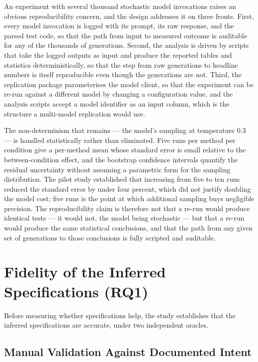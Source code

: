 An experiment with several thousand stochastic model invocations raises an
obvious reproducibility concern, and the design addresses it on three fronts.
First, every model invocation is logged with its prompt, its raw response, and
the parsed test code, so that the path from input to measured outcome is
auditable for any of the thousands of generations. Second, the analysis is driven
by scripts that take the logged outputs as input and produce the reported tables
and statistics deterministically, so that the step from raw generations to
headline numbers is itself reproducible even though the generations are not.
Third, the replication package parameterises the model client, so that the
experiment can be re-run against a different model by changing a configuration
value, and the analysis scripts accept a model identifier as an input column,
which is the structure a multi-model replication would use.

The non-determinism that remains --- the model's sampling at temperature 0.3 ---
is handled statistically rather than eliminated. Five runs per method per
condition give a per-method mean whose standard error is small relative to the
between-condition effect, and the bootstrap confidence intervals quantify the
residual uncertainty without assuming a parametric form for the sampling
distribution. The pilot study established that increasing from five to ten runs
reduced the standard error by under four percent, which did not justify doubling
the model cost; five runs is the point at which additional sampling buys
negligible precision. The reproducibility claim is therefore not that a re-run
would produce identical tests --- it would not, the model being stochastic --- but
that a re-run would produce the same statistical conclusions, and that the path
from any given set of generations to those conclusions is fully scripted and
auditable.

\section{Fidelity of the Inferred Specifications (RQ1)}
\label{sec:tg-fidelity}

Before measuring whether specifications help, the study establishes that the
inferred specifications are accurate, under two independent oracles.

\subsection{Manual Validation Against Documented Intent}

